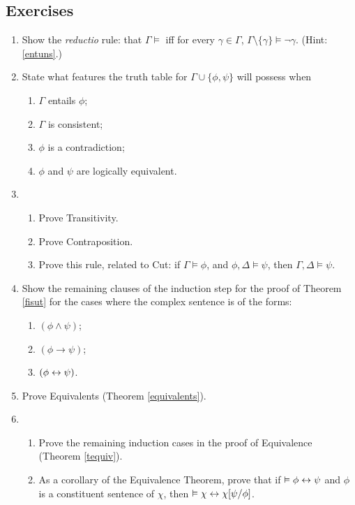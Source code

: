 {\small


\subsection*{Exercises} \label{ex4}


\begin{enumerate}
	\item Show the \emph{reductio} rule: that $\Gamma \vDash$ iff  for every $\gamma \in \Gamma$, $\Gamma\setminus\{\gamma\} \vDash ¬\gamma$. (Hint: \autoref{entuns}.)

	\item State what features the truth table for $\Gamma \cup \{\phi,\psi\}$ will possess when \begin{enumerate}
		\item $\Gamma$ entails $\phi$;
		\item $\Gamma$ is consistent;
		\item $\phi$ is a contradiction;
		\item $\phi$ and $\psi$ are logically equivalent.
	\end{enumerate}
	
\item \begin{enumerate}
	\item Prove Transitivity.
	\item Prove Contraposition.
	\item Prove this rule, related to Cut: if $\Gamma \vDash \phi$, and $\phi,\Delta \vDash \psi$, then $\Gamma,\Delta \vDash \psi$.
\end{enumerate} 

\item Show the remaining clauses of the induction step for the proof of Theorem \ref{fisut} for the cases where the complex sentence is of the forms: \begin{enumerate}
	\item $(\phi \wedge \psi)$;
	\item $(\phi \to \psi)$;
	\item $(\phi \leftrightarrow \psi)$.
\end{enumerate}


\item Prove Equivalents (Theorem \ref{equivalents}).

\item \begin{enumerate}
	\item Prove the remaining induction cases in the proof of Equivalence (Theorem \ref{tequiv}).
	\item As a corollary of the Equivalence Theorem, prove that if $\vDash \phi\leftrightarrow\psi$ and $\phi$ is a constituent sentence of $\chi$, then $\vDash \chi \leftrightarrow \chi[\psi/\phi]$.
\end{enumerate}


\end{enumerate}}
